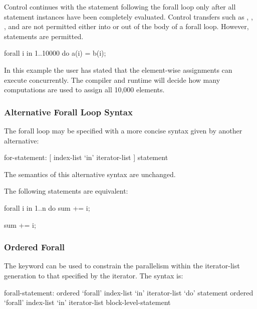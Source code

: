Control continues with the statement following the forall loop only
after all statement instances have been completely evaluated.
Control transfers such as , , ,
and  are not permitted either into or out of the body of
a forall loop.  However,  statements are permitted.

\begin{example}
\begin{chapel}
forall i in 1..10000 do
  a(i) = b(i);
\end{chapel}
In this example the user has stated that the element-wise assignments can
execute concurrently. The compiler and runtime will decide how many
computations are used to assign all 10,000 elements.
\end{example}

\subsubsection{Alternative Forall Loop Syntax}
\label{Alternative_Forall_Loop_Syntax}

The forall loop may be specified with a more concise syntax given by
another alternative:
\begin{syntax}
for-statement:
  [ index-list `in' iterator-list ] statement
\end{syntax}
The semantics of this alternative syntax are unchanged.

\begin{example}
The following statements are equivalent:
\begin{chapel}
forall i in 1..n do
  sum += i;
\end{chapel}
\begin{chapel}
[i in 1..n] sum += i;
\end{chapel}
\end{example}

\subsubsection{Ordered Forall}
\label{Ordered_Forall}

The  keyword can be used to constrain the parallelism
within the iterator-list generation to that specified by the iterator.
The syntax is:
\begin{syntax}
forall-statement:
   ordered `forall' index-list `in' iterator-list `do' statement
   ordered `forall' index-list `in' iterator-list block-level-statement
\end{syntax}

